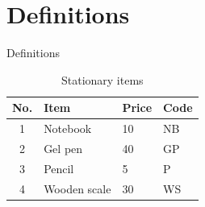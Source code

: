 \documentclass{beamer}
\begin{document}
	\section{Definitions}
	\begin{frame}{Definitions}
		\begin{table}[h]
			\centering
			\begin{tabular}{clll}
				\hline
				No. & Item & Price & Code\\
				\hline
				1 & Notebook & 10 & NB\\
				2 & Gel pen & 40 & GP\\
				3 & Pencil & 5 & P\\
				4 & Wooden scale & 30 & WS\\
				\hline
			\end{tabular}
			\caption{Stationary items}
		\end{table}
	\end{frame}
\end{document}
